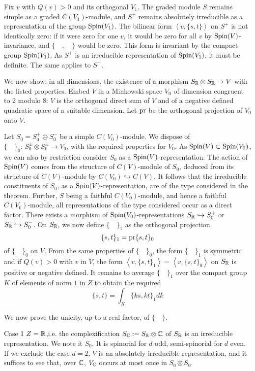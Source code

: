 Fix $v$ with $Q(v)>0$ and its orthogonal $V_1$.
The graded module $S$ remains simple as a graded
$C(V_1)$-module, and $S^+$ remains absolutely
irreducible as a representation of the group
$\text{\rm Spin}(V_1)$.
The bilinear form $\left<v,\{s,t\}\right>$ on $S^+$  is not
identically zero: if it were zero for one $v$, it would be
zero for all $v$
 by $\text{\rm Spin}(V)$-invariance, and $\{\quad,\quad\}$
would be zero.
This form is invariant by the compact group
$\text{\rm Spin}(V_1)$.
As $S^+$ is an irreducible representation of
$\text{\rm Spin}(V_1)$, it must be definite.
The same applies to $S^-$.

We now show, in all dimensions, the existence of a
morphism $S_{\Bbb R}\otimes S_{\Bbb R}\to V$ with the listed
properties.
Embed $V$ in a Minkowski space $V_0$ of dimension 
congruent to $2$ modulo $8$:
$V$ is the orthogonal direct sum of $V$ and of a
negative defined quadratic space of a suitable
dimension.
Let $\text{\rm pr}$ be the orthogonal projection of $V_0$ onto
$V$.

Let $S_0=S_0^+\oplus S_0^-$ be a simple
$C(V_0)$-module.
We dispose of $\{\quad\}_0\colon\,S_0^\pm\otimes
S_0^\pm\to V_0$, with the required properties for
$V_0$.
As $\text{\rm Spin}(V)\subset\text{\rm Spin}(V_0)$, we can also by
restriction consider $S_0$ as a
$\text{\rm Spin}(V)$-representation.
The action of $\text{\rm Spin}(V)$ comes from the structure of
$C(V)$-module of $S_0$, deduced from its structure of 
$C(V)$-module by $C(V_0)\hookrightarrow C(V)$.
It follows that the irreducible constituents of $S_0$,
as a $\text{\rm Spin}(V)$-representation, are of the type
considered in the theorem.
Further, $S$ being a faithful $C(V_0)$-module, and
hence a faithful $C(V_0)$-module, all representations of
the type considered occur as a direct factor.
There exists a morphism of $\text{\rm Spin}(V_0)$-representations
$S_{\Bbb R}\hookrightarrow S_0^+$ or $S_{\Bbb R}\hookrightarrow
S_0^-$.
On $S_{\Bbb R}$, we now define $\{\quad\}_1$ as the
orthogonal projection
$$
\{s,t\}_1=\text{\rm pr}\{s,t\}_0
$$
of $\{\quad\}_0$ on $V$.
{}From the same properties of $\{\quad\}_0$, the form
$\{\quad\}_1$ is symmetric and if $Q(v)>0$ with $v$ in
$V$, the form $\left<v,\{s,t\}_1\right>=
\left<v,\{s,t\}_0\right>$ on $S_{\Bbb R}$
is positive or negative defined.
It remains to average $\{\quad\}_1$ over the compact
group $K$ of elements of norm $1$ in $Z$ to obtain the
required
$$
\{s,t\}=\int_{K}\{ks,kt\}_1 dk
$$

We now prove the unicity, up to a real factor, of
$\{\quad\}$.

\subhead
{\rm Case 1}
\endsubhead
$Z={\Bbb R}$,i.e. the complexification $S_{\Bbb C}:=
S_{\Bbb R}\otimes{\Bbb C}$ of $S_{\Bbb R}$ is an irreducible
representation.
We note it $S_0$.
It is spinorial for $d$ odd, semi-spinorial for $d$
even.
If we exclude the case $d=2$, $V$ is an absolutely irreducible
representation, and it suffices to see that, over
${\Bbb C}$, $V_{\Bbb C}$ occurs at most once in $S_0\otimes S_0$.

